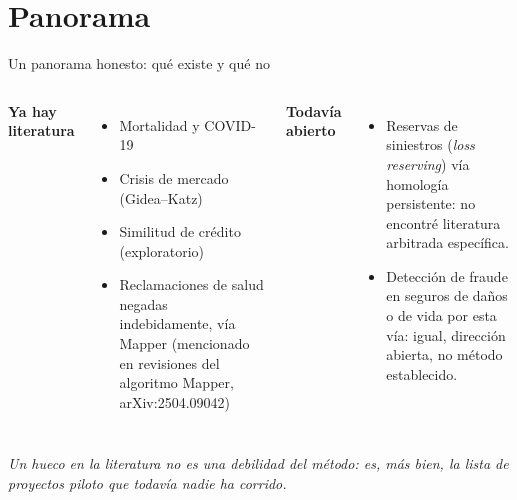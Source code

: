 \documentclass[aspectratio=169,11pt]{beamer}
\begin{document}
\section{Panorama}
\begin{frame}{Un panorama honesto: qué existe y qué no}
  \begin{columns}[T]
    \textbf{\color{accent}Ya hay literatura}
    \begin{itemize}
      \item Mortalidad y COVID-19
      \item Crisis de mercado (Gidea--Katz)
      \item Similitud de crédito (exploratorio)
      \item Reclamaciones de salud negadas indebidamente,
        vía Mapper (mencionado en revisiones del algoritmo Mapper,
        arXiv:2504.09042)
    \end{itemize}
    \textbf{\color{accent2}Todavía abierto}
    \begin{itemize}
      \item Reservas de siniestros (\textit{loss reserving}) vía
        homología persistente: no encontré literatura arbitrada
        específica.
      \item Detección de fraude en seguros de daños o de vida por esta
        vía: igual, dirección abierta, no método establecido.
    \end{itemize}
  \end{columns}
  \vspace{0.8em}
  {\small\itshape\color{muted}
  Un hueco en la literatura no es una debilidad del método: es, más bien,
  la lista de proyectos piloto que todavía nadie ha corrido.}
\end{frame}
\end{document}
